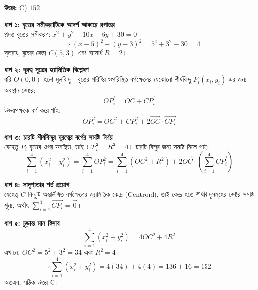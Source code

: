 \documentclass[12pt, a4paper]{article}
\begin{document}
\vspace{0.5em}
\begin{tcolorbox}[answerbox]
    \textbf{\color{success} উত্তর:} C) $152$
\end{tcolorbox}
\vspace{1em}

\begin{tcolorbox}[solutionbox={সমাধান (Solution)}]
    \noindent
    \textbf{ধাপ ১: বৃত্তের সমীকরণটিকে আদর্শ আকারে রূপান্তর} \\
    প্রদত্ত বৃত্তের সমীকরণ: $x^2 + y^2 - 10x - 6y + 30 = 0$
    \[ \implies (x - 5)^2 + (y - 3)^2 = 5^2 + 3^2 - 30 = 4 \]
    সুতরাং, বৃত্তের কেন্দ্র $C(5, 3)$ এবং ব্যাসার্ধ $R = 2$।
    
    \vspace{0.5em}
    \noindent\textbf{ধাপ ২: দূরত্ব সূত্রের জ্যামিতিক বিশ্লেষণ} \\
    ধরি $O(0,0)$ হলো মূলবিন্দু। বৃত্তের পরিধির ওপরিস্থিত বর্গক্ষেত্রের যেকোনো শীর্ষবিন্দু $P_i(x_i, y_i)$ এর জন্য অবস্থান ভেক্টর:
    \[ \vec{OP_i} = \vec{OC} + \vec{CP_i} \]
    উভয়পক্ষকে বর্গ করে পাই:
    \[ OP_i^2 = OC^2 + CP_i^2 + 2\vec{OC} \cdot \vec{CP_i} \]
    
    \vspace{0.5em}
    \noindent\textbf{ধাপ ৩: চারটি শীর্ষবিন্দুর দূরত্বের বর্গের সমষ্টি নির্ণয়} \\
    যেহেতু $P_i$ বৃত্তের ওপর অবস্থিত, তাই $CP_i^2 = R^2 = 4$। চারটি বিন্দুর জন্য সমষ্টি নিলে পাই:
    \[ \sum_{i=1}^4 (x_i^2 + y_i^2) = \sum_{i=1}^4 OP_i^2 = \sum_{i=1}^4 (OC^2 + R^2) + 2\vec{OC} \cdot \left(\sum_{i=1}^4 \vec{CP_i}\right) \]
    
    \vspace{0.5em}
    \noindent\textbf{ধাপ ৪: সাদৃশ্যতার শর্ত প্রয়োগ} \\
    যেহেতু $C$ বিন্দুটি অন্তর্লিখিত বর্গক্ষেত্রের জ্যামিতিক কেন্দ্র (Centroid), তাই কেন্দ্র হতে শীর্ষবিন্দুসমূহের ভেক্টর সমষ্টি শূন্য, অর্থাৎ $\sum_{i=1}^4 \vec{CP_i} = \vec{0}$।
    
    \vspace{0.5em}
    \noindent\textbf{ধাপ ৫: চূড়ান্ত মান হিসাব} \\
    \[ \sum_{i=1}^4 (x_i^2 + y_i^2) = 4OC^2 + 4R^2 \]
    এখানে, $OC^2 = 5^2 + 3^2 = 34$ এবং $R^2 = 4$।
    \[ \therefore \sum_{i=1}^4 (x_i^2 + y_i^2) = 4(34) + 4(4) = 136 + 16 = 152 \]
    অতএব, সঠিক উত্তর C।
\end{tcolorbox}
\end{document}
